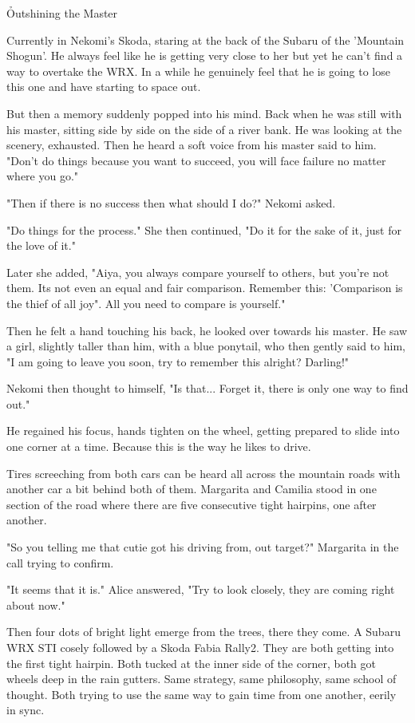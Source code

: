 \h{Outshining the Master}

Currently in Nekomi's Skoda, staring at the back of the Subaru of the 'Mountain Shogun'. 
He always feel like he is getting very close to her but yet he can't find a way to overtake the WRX. 
In a while he genuinely feel that he is going to lose this one and have starting to space out.

But then a memory suddenly popped into his mind. Back when he was still with his master, sitting side by side on the side of a river bank.
He was looking at the scenery, exhausted. 
Then he heard a soft voice from his master said to him. 
"Don't do things because you want to succeed, you will face failure no matter where you go."

"Then if there is no success then what should I do?" Nekomi asked.

"Do things for the process." She then continued, "Do it for the sake of it, just for the love of it."

Later she added, "Aiya, you always compare yourself to others, but you're not them. Its not even an equal and fair comparison. Remember this: 'Comparison is the thief of all joy". All you need to compare is yourself."

Then he felt a hand touching his back, he looked over towards his master. 
He saw a girl, slightly taller than him, with a blue ponytail, who then gently said to him, "I am going to leave you soon, try to remember this alright? Darling!"

Nekomi then thought to himself, "Is that... Forget it, there is only one way to find out."

He regained his focus, hands tighten on the wheel, getting prepared to slide into one corner at a time. 
Because this is the way he likes to drive.

Tires screeching from both cars can be heard all across the mountain roads with another car a bit behind both of them. 
Margarita and Camilia stood in one section of the road where there are five consecutive tight hairpins, one after another.

"So you telling me that cutie got his driving from, out target?" Margarita in the call trying to confirm.

"It seems that it is." Alice answered, "Try to look closely, they are coming right about now."

Then four dots of bright light emerge from the trees, there they come. 
A Subaru WRX STI cosely followed by a Skoda Fabia Rally2. 
They are both getting into the first tight hairpin. 
Both tucked at the inner side of the corner, both got wheels deep in the rain gutters. 
Same strategy, same philosophy, same school of thought. 
Both trying to use the same way to gain time from one another, eerily in sync.

